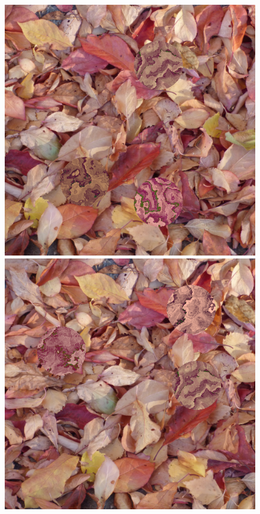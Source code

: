 \documentclass[acmtog]{acmart}
\begin{document}
\begin{figure}
    \includegraphics[scale=0.24]{20221121_1819_step_6324.png}
    \hfill
    \includegraphics[scale=0.24]{20221121_1819_step_6464.png}

\end{figure}
\end{document}
